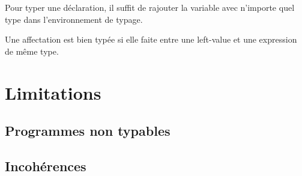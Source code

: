 Pour typer une déclaration, il suffit de rajouter la variable avec n'importe
quel type dans l'environnement de typage.

\begin{mathpar}
\end{mathpar}

Une affectation est bien typée si elle faite entre une left-value et une
expression de même type.

\begin{mathpar}
\end{mathpar}

\wip{}

\begin{mathpar}
\end{mathpar}

\section{Limitations}
\subsection{Programmes non typables}
\subsection{Incohérences}
